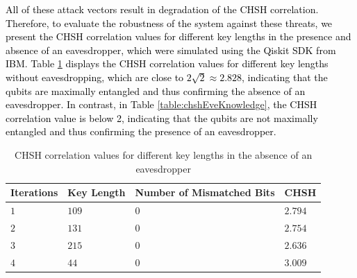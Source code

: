 \documentclass[a4paper]{cas-sc}
\begin{document}
\textcolor{black}{All of these attack vectors result in degradation of the CHSH correlation. Therefore, to evaluate the robustness of the system against these threats, we present the CHSH correlation values for different key lengths in the presence and absence of an eavesdropper, which were simulated using the Qiskit SDK from IBM. Table \ref{table:chsheRsults} displays the CHSH correlation values for different key lengths without eavesdropping, which are close to $2\sqrt{2} \approx 2.828$, indicating that the qubits are maximally entangled and thus confirming the absence of an eavesdropper. In contrast, in Table \ref{table:chshEveKnowledge}, the CHSH correlation value is below 2, indicating that the qubits are not maximally entangled and thus confirming the presence of an eavesdropper.}
\begin{table}[pos=h]
    \begin{center}
        \caption{CHSH correlation values for different key lengths in the absence of an eavesdropper}
        \begin{tabularx}{\textwidth}{>{\centering\arraybackslash}X>{\centering\arraybackslash}X>{\centering\arraybackslash}X>{\centering\arraybackslash}X}
            \hline
            Iterations & Key Length & Number of Mismatched Bits & CHSH    \\ \hline
            $1$        & $109$      & $0$                       & $2.794$ \\
            $2$        & $131$      & $0$                       & $2.754$ \\
            $3$        & $215$      & $0$                       & $2.636$ \\
            $4$        & $44$       & $0$                       & $3.009$ \\
            \hline
        \end{tabularx}
        \label{table:chsheRsults}
    \end{center}
\end{table}
\end{document}
